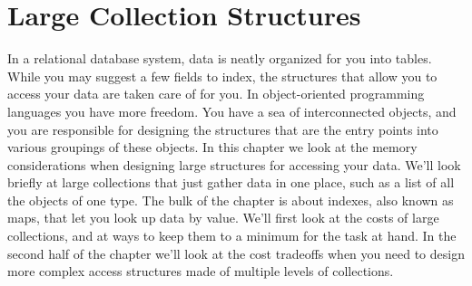 \chapter{Large Collection Structures}
\label{chapter:tables-indexes}

In a relational database system, data is neatly organized for you into tables.
While you may suggest a few fields to index, the structures that
allow you to access your data are taken care of for you.  In object-oriented
programming languages you have more freedom. You have a sea of interconnected
objects, and you are responsible for designing the structures that are the entry
points into various groupings of these objects.
In this chapter we look at the memory considerations when
designing large structures for accessing your
data. We'll
look briefly at large collections that just gather data in one place, such as a
list of all the objects of one type. The bulk of the chapter is about
indexes, also known as maps, that let you look up data by value. We'll first look at the costs of large collections,
and at ways to keep them to a minimum for the task at hand. In the second half
of the chapter we'll look at the cost tradeoffs when you need to
design more complex access structures made of multiple levels of collections.  









